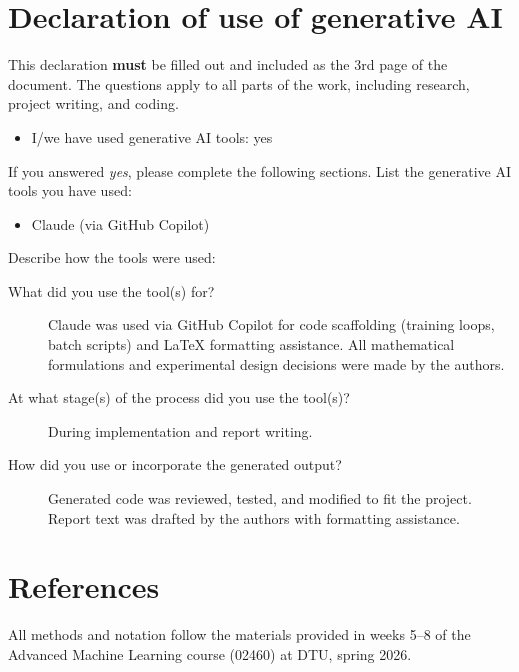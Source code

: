 \documentclass[10pt,a4paper]{article}
\begin{document}
\newpage


\section*{Declaration of use of generative AI}

This declaration \textbf{must} be filled out and included as the 3rd page of the document. The questions apply to all parts of the work, including research, project writing, and coding.
\begin{itemize}
\item I/we have used generative AI tools: yes
\end{itemize}
If you answered \emph{yes}, please complete the following sections. List the generative AI tools you have used:
\begin{itemize}
\item Claude (via GitHub Copilot)
\end{itemize}
Describe how the tools were used:
\begin{description}
\item[What did you use the tool(s) for?] Claude was used via GitHub Copilot for code scaffolding (training loops, batch scripts) and \LaTeX{} formatting assistance. All mathematical formulations and experimental design decisions were made by the authors.
\item[At what stage(s) of the process did you use the tool(s)?] During implementation and report writing.
\item[How did you use or incorporate the generated output?] Generated code was reviewed, tested, and modified to fit the project. Report text was drafted by the authors with formatting assistance.
\end{description}

\newpage


\section*{References}
All methods and notation follow the materials provided in weeks 5--8 of the Advanced Machine Learning course (02460) at DTU, spring 2026.
\end{document}
